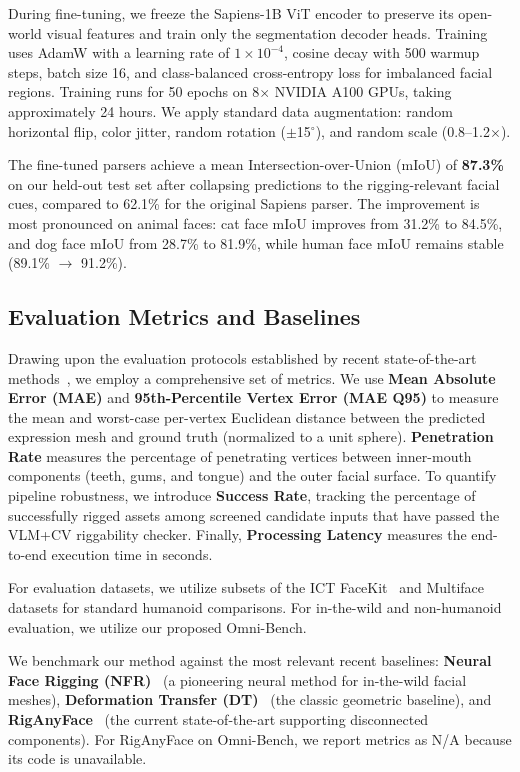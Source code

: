 \documentclass[acmtog,anonymous,review]{acmart}
\begin{document}
During fine-tuning, we freeze the Sapiens-1B ViT encoder to preserve its open-world visual features and train only the segmentation decoder heads. Training uses AdamW with a learning rate of $1 \times 10^{-4}$, cosine decay with 500 warmup steps, batch size 16, and class-balanced cross-entropy loss for imbalanced facial regions. Training runs for 50 epochs on 8$\times$ NVIDIA A100 GPUs, taking approximately 24 hours. We apply standard data augmentation: random horizontal flip, color jitter, random rotation ($\pm$15$^\circ$), and random scale (0.8--1.2$\times$).

The fine-tuned parsers achieve a mean Intersection-over-Union (mIoU) of \textbf{87.3\%} on our held-out test set after collapsing predictions to the rigging-relevant facial cues, compared to 62.1\% for the original Sapiens parser. The improvement is most pronounced on animal faces: cat face mIoU improves from 31.2\% to 84.5\%, and dog face mIoU from 28.7\% to 81.9\%, while human face mIoU remains stable (89.1\% $\rightarrow$ 91.2\%).

\subsection{Evaluation Metrics and Baselines}
\label{subsec:metrics}

Drawing upon the evaluation protocols established by recent state-of-the-art methods~\cite{ma2025riganyface, qin2023neural, cha2025neural}, we employ a comprehensive set of metrics. We use \textbf{Mean Absolute Error (MAE)} and \textbf{95th-Percentile Vertex Error (MAE Q95)} to measure the mean and worst-case per-vertex Euclidean distance between the predicted expression mesh and ground truth (normalized to a unit sphere). \textbf{Penetration Rate} measures the percentage of penetrating vertices between inner-mouth components (teeth, gums, and tongue) and the outer facial surface. To quantify pipeline robustness, we introduce \textbf{Success Rate}, tracking the percentage of successfully rigged assets among screened candidate inputs that have passed the VLM+CV riggability checker. Finally, \textbf{Processing Latency} measures the end-to-end execution time in seconds.

For evaluation datasets, we utilize subsets of the ICT FaceKit~\cite{li2020dynamic} and Multiface~\cite{wuu2022multiface} datasets for standard humanoid comparisons. For in-the-wild and non-humanoid evaluation, we utilize our proposed Omni-Bench.

We benchmark our method against the most relevant recent baselines: \textbf{Neural Face Rigging (NFR)}~\cite{qin2023neural} (a pioneering neural method for in-the-wild facial meshes), \textbf{Deformation Transfer (DT)}~\cite{sumner2004deformation} (the classic geometric baseline), and \textbf{RigAnyFace}~\cite{ma2025riganyface} (the current state-of-the-art supporting disconnected components). For RigAnyFace on Omni-Bench, we report metrics as N/A because its code is unavailable.
\end{document}
